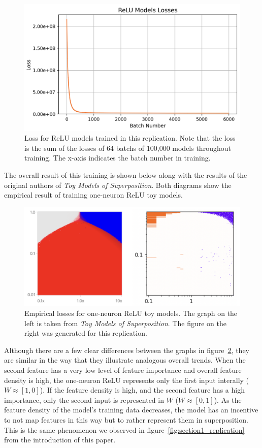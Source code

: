 \documentclass{article} %
\begin{document}
\begin{figure}[h]
    \centering
    \includegraphics[width=0.5\linewidth]{phase_changes/images/relu_loss.png}
    \captionsetup{font=footnotesize, width=0.7\linewidth} %
    \caption{
        Loss for ReLU models trained in this replication. Note that the loss
        is the sum of the losses of 64 batchs of 100,000 models throughout 
        training. The x-axis indicates the batch number in training.
    }
    \label{fig:relu_loss}
\end{figure}

The overall result of this training is shown below along with the results of
the original authors of \textit{Toy Models of Superposition}. Both diagrams show
the empirical result of training one-neuron ReLU toy models.

\begin{figure}[h]
    \centering
    \includegraphics[width=0.5\linewidth]{phase_changes/images/relu_empirical.png}
    \captionsetup{font=footnotesize, width=0.7\linewidth} %
    \caption{
        Empirical losses for one-neuron ReLU toy models. The graph on the left
        is taken from \textit{Toy Models of Superposition}. The figure on the
        right was generated for this replication.
    }
    \label{fig:relu_empirical}
\end{figure}

Although there are a few clear differences between the graphs in
figure~\ref{fig:relu_empirical}, they are similar in the way that they illustrate
analogous overall trends. When the second feature has a very low level of feature
importance and overall feature density is high, the one-neuron ReLU represents
only the first input interally ($W \approx [1, 0]$). If the feature density is high,
and the second feature has a high importance, only the second input is represented
in $W$ ($W \approx [0, 1]$). As the feature density of the model's training data
decreases, the model has an incentive to not map features in this way but to rather
represent them in superposition. This is the same phenomenon we observed in 
figure~\ref{fig:section1_replication} from the introduction of this paper.\\
\end{document}
